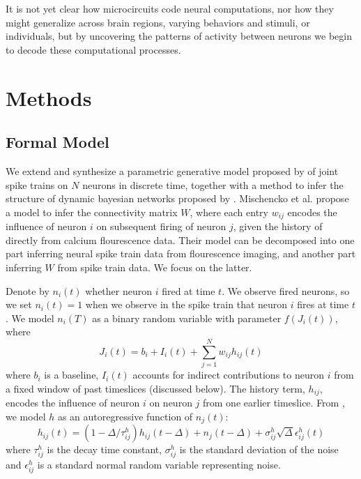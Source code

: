 \documentclass{article}
\begin{document}
It is not yet clear how microcircuits code neural
computations, nor how they might generalize across brain regions, varying behaviors and stimuli, 
or individuals, but by uncovering the patterns of activity between
neurons we begin to decode these computational processes.

\section{Methods}

\subsection{Formal Model}
We extend and synthesize a parametric generative model proposed by
\citep{mishchencko2011} of joint spike trains on $N$ neurons in
discrete time, together with a method to infer the structure of
dynamic bayesian networks proposed by \citep{patnaik2011}. Mischencko
et al. propose a model to infer the connectivity matrix $W$, where
each entry $w_{ij}$ encodes the influence of neuron $i$ on subsequent
firing of neuron $j$, given the history of  directly from calcium
flourescence data. Their model can be decomposed into one part
inferring neural spike train data from flourescence imaging, and
another part inferring $W$ from spike train data. We focus on the
latter.

Denote by $ n_i(t) $ whether neuron $i$ fired at time $t$. We observe
fired neurons, so we set $n_i(t) = 1$ when we observe in the spike
train that neuron $i$ fires at time $t$. We model $n_i(T)$ as a
binary random variable with parameter $f(J_i(t))$, where
\begin{equation}\label{J}  J_i(t) = b_i + I_i(t) + \sum_{j=1}^{N}
w_{ij}h_{ij}(t) \end{equation} where $b_i$ is a baseline, $I_i(t)$
accounts for indirect contributions to neuron $i$ from a fixed window of
past timeslices (discussed below). The history term, $h_{ij}$, encodes
the influence of neuron $i$ on neuron $j$ from one earlier timeslice.
From \citep{mishchencko2011}, we model $h$ as an autoregressive function of
$n_j(t)$: \begin{equation}\label{h} h_{ij}(t) = (1-\Delta/\tau_{ij}^h)h_{ij}(t-\Delta)
  + n_j(t-\Delta)+\sigma_{ij}^h\sqrt{\Delta}\epsilon_{ij}^h(t) \end{equation}
where $ \tau_{ij}^h $ is the decay time constant, $\sigma_{ij}^h$ is the
standard deviation of the noise and $\epsilon_{ij}^h$ is a standard
normal random variable representing noise.
\end{document}
